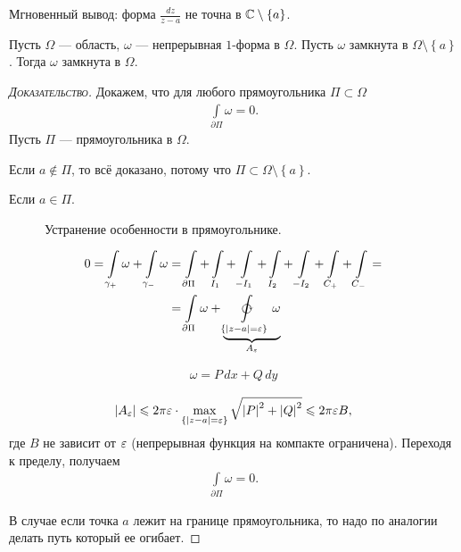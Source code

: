 \documentclass[../complex-analysis.tex]{subfiles}
\begin{document}
Мгновенный вывод: форма $\frac{dz}{z - a}$ не точна в $\mathbb{C} \setminus \left\{ a \right\}$.

\begin{lm}
\label{lemma:ob_ustranenii_osobennosti}
 Пусть $\Omega$ --- область, $\omega$ --- непрерывная $1$-форма в $\Omega$. Пусть $\omega$ замкнута  в $\Omega \setminus \left\{ a \right\}$. Тогда $\omega$ замкнута в $\Omega$.
\end{lm}
\begin{proof}[\normalfont\textsc{Доказательство}]
 Докажем, что для любого прямоугольника $\Pi \subset \Omega$
 \begin{align*}
  \int\limits_{\partial\Pi} \omega = 0. 
 \end{align*} Пусть $\Pi$ --- прямоугольника в $\Omega$.

 Если $a \notin \Pi$, то всё доказано, потому что $\Pi \subset \Omega \setminus \left\{ a \right\}$.

 Если $a \in \Pi$.

\begin{figure}[ht]
    \centering
    \caption{Устранение особенности в прямоугольнике.}
    \label{fig:special_point_in_rectangle}
\end{figure}

\begin{align*}
 0 = \int\limits_{\gamma_+}  \omega + \int\limits_{\gamma_-}  \omega &= \int\limits_{\partial\Pi} + \int\limits_{I_1}   + \int\limits_{-I_1}   + \int\limits_{I_2}  + \int\limits_{-I_2}   + \int\limits_{C_+}   + \int\limits_{C_-}   = \\
 &= \int\limits_{\partial\Pi} \omega + \underbrace{\varointclockwise\limits_{\left\{ \left| z-a \right|=\eps \right\}} \omega}_{A_{\eps}} 
\end{align*} 

\begin{align*}
 \omega = P\,dx + Q\,dy
\end{align*} 

\begin{align*}
 \left| A_{\varepsilon} \right| \leqslant 2\pi\varepsilon \cdot \max_{\left\{ \left| z-a \right|=\varepsilon \right\}} \sqrt{\left| P \right|^{2} + \left| Q \right|^{2}} \leqslant 2\pi\varepsilon B,
\end{align*} где $B$ не зависит от $\varepsilon$ (непрерывная функция на компакте ограничена). Переходя к пределу, получаем 
\begin{align*}
 \int\limits_{\partial\Pi}   \omega = 0.
\end{align*} 

В случае если точка $a$ лежит на границе прямоугольника, то надо по аналогии делать путь который ее огибает.
 
\end{proof}
\end{document}
